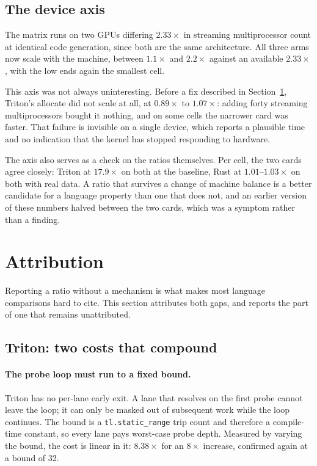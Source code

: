 \documentclass[11pt]{article}
\begin{document}
\subsection{The device axis}

The matrix runs on two GPUs differing $2.33\times$ in streaming multiprocessor
count at identical code generation, since both are the same architecture. All
three arms now scale with the machine, between $1.1\times$ and $2.2\times$
against an available $2.33\times$, with the low ends again the smallest cell.

This axis was not always uninteresting. Before a fix described in
Section~\ref{sec:attribution}, Triton's allocate did not scale at all, at
$0.89\times$ to $1.07\times$: adding forty streaming multiprocessors bought it
nothing, and on some cells the narrower card was faster. That failure is
invisible on a single device, which reports a plausible time and no indication
that the kernel has stopped responding to hardware.

The axis also serves as a check on the ratios themselves. Per cell, the two cards
agree closely: Triton at $17.9\times$ on both at the baseline, Rust at
$1.01$--$1.03\times$ on both with real data. A ratio that survives a change of
machine balance is a better candidate for a language property than one that does
not, and an earlier version of these numbers halved between the two cards, which
was a symptom rather than a finding.

\section{Attribution}
\label{sec:attribution}

Reporting a ratio without a mechanism is what makes most language comparisons
hard to cite. This section attributes both gaps, and reports the part of one that
remains unattributed.

\subsection{Triton: two costs that compound}

\paragraph{The probe loop must run to a fixed bound.} Triton has no per-lane
early exit. A lane that resolves on the first probe cannot leave the loop; it can
only be masked out of subsequent work while the loop continues. The bound is a
\texttt{tl.static\_range} trip count and therefore a compile-time constant, so
every lane pays worst-case probe depth. Measured by varying the bound, the cost
is linear in it: $8.38\times$ for an $8\times$ increase, confirmed again at a
bound of 32.
\end{document}
